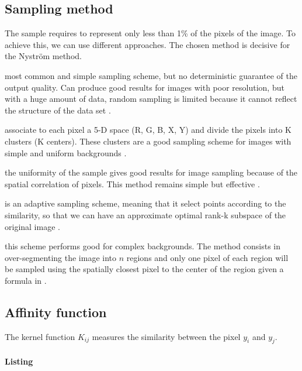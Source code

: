 \subsection{Sampling method}
\label{subsec:sampling-variations}
The sample requires to represent only less than 1\% of the pixels of the image. To achieve this, we can use different approaches. The chosen method is decisive for the Nystr\"om method.
\begin{description}[align=left]
 \item [Random sampling (RS)] most common and simple sampling scheme, but no deterministic guarantee of the output quality. Can produce good results for images with poor resolution, but with a huge amount of data, random sampling is limited because it cannot reflect the structure of the data set \cite{zhan_improved_2017}.
 \item [K-means sampling (KS)] associate to each pixel a 5-D space (R, G, B, X, Y) and divide the pixels into K clusters (K centers). These clusters are a good sampling scheme for images with simple and uniform backgrounds \cite{kao_sampling_2012} \cite{zhang_improved_2008}.
 \item [Uniform spatially sampling] the uniformity of the sample gives good results for image sampling because of the spatial correlation of pixels. This method remains simple but effective \cite{glide_2014}.
 \item [Incremental sampling (INS)] is an adaptive sampling scheme, meaning that it select points according to the similarity, so that we can have an approximate optimal rank-k subspace of the original image \cite{zhan_improved_2017}.
 \item [Mean-shift segmentation-based sampling] this scheme performs good for complex backgrounds. The method consists in over-segmenting the image into \(n\) regions and only one pixel of each region will be sampled using the spatially closest pixel to the center of the region given a formula in \cite{kao_sampling_2012}.
\end{description}

\subsection{Affinity function}
\label{subsec:kernel-variations}
The kernel function \(K_{ij}\) measures the similarity between the pixel \(y_i\) and \(y_j\).

\paragraph{Listing}

